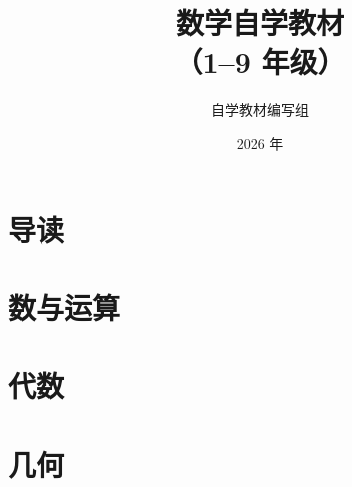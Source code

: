 \documentclass[b5paper, openany, 12pt, fontset=none]{ctexbook}
\title{数学自学教材\\（1--9 年级）}
\author{自学教材编写组}
\date{2026 年}
\begin{document}
\maketitle
\tableofcontents

\part*{导读}





\part{数与运算}











\part{代数}














\part{几何}












\end{document}
